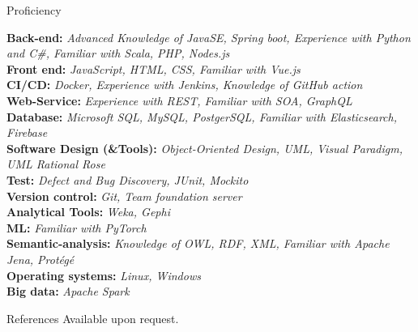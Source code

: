 \documentclass{resume} %
\begin{document}
\begin{rSection}{Proficiency}

{\bf Back-end:}  {\em Advanced Knowledge of JavaSE, Spring boot, Experience with Python and C\#,  Familiar with Scala, PHP, Nodes.js} \\
{\bf Front end:}  {\em   JavaScript, HTML, CSS, Familiar with Vue.js}\\
{\bf CI/CD:}  {\em  Docker, Experience with Jenkins, Knowledge of GitHub action}\\
{\bf Web-Service:}  {\em  Experience with REST, Familiar with SOA, GraphQL}\\
{\bf Database:}  {\em Microsoft SQL, MySQL, PostgerSQL, Familiar with Elasticsearch, Firebase}\\
{\bf Software Design (\&Tools):}  {\em Object-Oriented Design, UML, Visual Paradigm, UML Rational Rose}\\
{\bf Test:}  {\em Defect and Bug Discovery, JUnit, Mockito}\\
{\bf Version control:}  {\em Git, Team foundation server}\\
{\bf Analytical Tools:}  {\em Weka, Gephi}\\
{\bf ML:}  {\em Familiar with PyTorch}\\
{\bf Semantic-analysis:}  {\em  Knowledge of OWL, RDF, XML, Familiar with Apache Jena, Protégé}\\
{\bf Operating systems:}  {\em Linux, Windows}\\
{\bf Big data:}  {\em Apache Spark}\\


\end{rSection}
\begin{rSection}{References}
	Available upon request.
	
	
	
\end{rSection}
\end{document}
